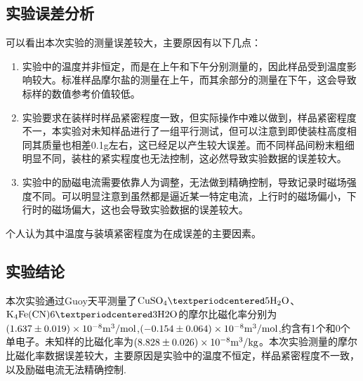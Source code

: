 \documentclass[12pt]{article}
\begin{document}
		\subsection{实验误差分析}
		可以看出本次实验的测量误差较大，主要原因有以下几点：
		\begin{enumerate}
			\item 实验中的温度并非恒定，而是在上午和下午分别测量的，因此样品受到温度影响较大。标准样品摩尔盐的测量在上午，而其余部分的测量在下午，这会导致标样的数值参考价值较低。
			\item 实验要求在装样时样品紧密程度一致，但实际操作中难以做到，样品紧密程度不一，本实验对未知样品进行了一组平行测试，但可以注意到即使装柱高度相同其质量也相差0.1g左右，这已经足以产生较大误差。而不同样品间粉末粗细明显不同，装柱的紧实程度也无法控制，这必然导致实验数据的误差较大。
			\item 实验中的励磁电流需要依靠人为调整，无法做到精确控制，导致记录时磁场强度不同。可以明显注意到虽然都是逼近某一特定电流，上行时的磁场偏小，下行时的磁场偏大，这也会导致实验数据的误差较大。
		\end{enumerate} \par
		个人认为其中温度与装填紧密程度为在成误差的主要因素。
 	 
 		\subsection{实验结论}
		本次实验通过Guoy天平测量了$\rm{CuSO_{4}·5H_{2}O}$、$\rm{K_{4}Fe(CN){6}·3H{2}O}$的摩尔比磁化率分别为$(1.637\pm0.019)\times10^{-8}\rm{m^{3}/mol}$,$(-0.154\pm0.064)\times10^{-8}\rm{m^{3}/mol}$,约含有1个和0个单电子。未知样的比磁化率为$(8.828\pm0.026)\times10^{-8}\rm{m^{3}/kg}$。本次实验测量的摩尔比磁化率数据误差较大，主要原因是实验中的温度不恒定，样品紧密程度不一致，以及励磁电流无法精确控制.

\vbox{}  


\end{document}
